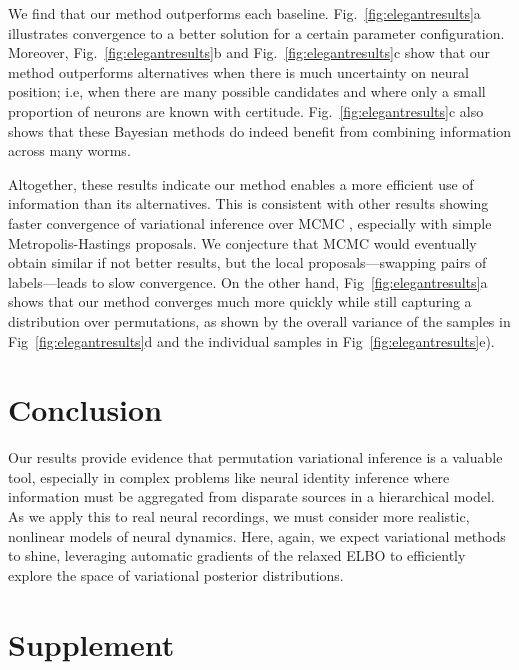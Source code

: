 \documentclass[twoside]{article}
\begin{document}
We find that our method outperforms each
baseline. Fig.~\ref{fig:elegantresults}a illustrates convergence to a
better solution for a certain parameter configuration. Moreover,
Fig.~\ref{fig:elegantresults}b and Fig.~\ref{fig:elegantresults}c show
that our method outperforms alternatives when there is much
uncertainty on neural position; i.e, when there are many possible
candidates and where only a small proportion of neurons are known with
certitude. Fig.~\ref{fig:elegantresults}c also shows that these
Bayesian methods do indeed benefit from combining information across many
worms.

Altogether, these results indicate our method enables a more efficient
use of information than its alternatives. This is consistent with
other results showing faster convergence of variational inference over
MCMC \cite{Blei2017}, especially with simple Metropolis-Hastings
proposals. We conjecture that MCMC would eventually obtain similar if
not better results, but the local proposals---swapping pairs of
labels---leads to slow convergence. On the other hand,
Fig~\ref{fig:elegantresults}a shows that our method converges much
more quickly while still capturing a distribution over permutations,
as shown by the overall variance of the samples in Fig~\ref{fig:elegantresults}d and the individual samples in Fig~\ref{fig:elegantresults}e).
\vspace{-.5em}
\section{Conclusion}
\vspace{-.5em}
Our results provide evidence that permutation
variational inference is a valuable tool, especially in complex
problems like neural identity inference where information must be
aggregated from disparate sources in a hierarchical model.  As we
apply this to real neural recordings, we must consider more realistic,
nonlinear models of neural dynamics. Here, again, we expect
variational methods to shine, leveraging automatic gradients of the
relaxed ELBO to efficiently explore the space of variational posterior
distributions.





\pagebreak 
\appendix


\section*{Supplement}
\end{document}
